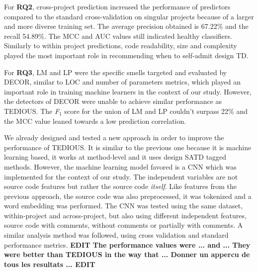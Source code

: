 For \textbf{RQ2}, cross-project prediction increased the performance of predictors compared to the standard cross-validation on singular projects because of a larger and more diverse training set. The average precision obtained is 67.22\% and the recall 54.89\%. The MCC and AUC values still indicated healthy classifiers. Similarly to within project predictions, code readability, size and complexity played the most important role in recommending when to self-admit design \ac{TD}. \par

For \textbf{RQ3}, \ac{LM} and \ac{LP} were the specific smells targeted and evaluated by \ac{DECOR}, similar to \ac{LOC} and number of parameters metrics, which played an important role in training machine learners in the context of our study. However, the detectors of \ac{DECOR} were unable to achieve similar performance as \ac{TEDIOUS}. The \emph{F$_{1}$} score for the union of \ac{LM} and \ac{LP} couldn't surpass 22\% and the \ac{MCC} value leaned towards a low prediction correlation. \par

We already designed and tested a new approach in order to improve the performance of \ac{TEDIOUS}. It is similar to the previous one because it is machine learning based, it works at method-level and it uses design \ac{SATD} tagged methods. However, the machine learning model favored is a \ac{CNN} which was implemented for the context of our study. The independent variables are not source code features but rather the source code \emph{itself}. Like features from the previous approach, the source code was also preprocessed, it was tokenized and a word embedding was performed. The \ac{CNN} was tested using the same dataset, within-project and across-project, but also using different independent features, source code with comments, without comments or partially with comments. A similar analysis method was followed, using cross validation and standard performance metrics.
\textbf{EDIT The performance values were ... and ... They were better than \ac{TEDIOUS} in the way that ... Donner un appercu de tous les resultats ... EDIT}


